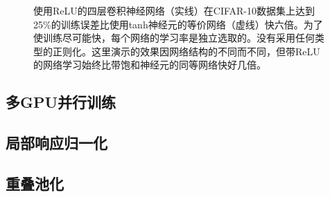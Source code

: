 \documentclass[12pt]{article}
\begin{document}
\begin{CJK*}{UTF8}{gkai}
\begin{figure}[ht]
  \centering
  \caption{使用ReLU的四层卷积神经网络（实线）在CIFAR-10数据集上达到25\%的训练误差比使用tanh神经元的等价网络（虚线）快六倍。为了使训练尽可能快，每个网络的学习率是独立选取的。没有采用任何类型的正则化。这里演示的效果因网络结构的不同而不同，但带ReLU的网络学习始终比带饱和神经元的同等网络快好几倍。}
  \label{fig:fig1}
\end{figure}

\subsection{多GPU并行训练}


\subsection{局部响应归一化}


\subsection{重叠池化}



\end{CJK*}
\end{document}
